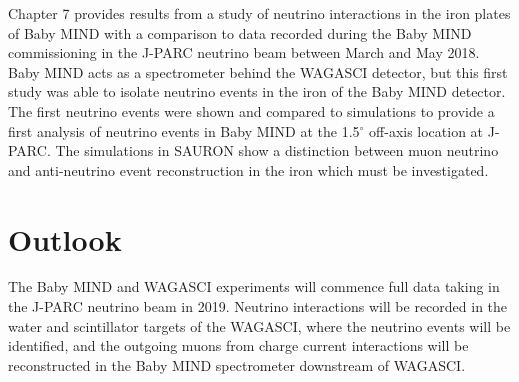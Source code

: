Chapter 7 provides results from a study of neutrino interactions in the iron plates of Baby MIND with a comparison to data recorded during the Baby MIND commissioning in the J-PARC neutrino beam between March and May 2018. Baby MIND acts as a spectrometer behind the WAGASCI detector, but this first study was able to isolate neutrino events in the iron of the Baby MIND detector. The first neutrino events were shown and compared to simulations to provide a first analysis of neutrino events in Baby MIND at the 1.5$^\circ$ off-axis location at J-PARC. The simulations in SAURON show a distinction between muon neutrino and anti-neutrino event reconstruction in the iron which must be investigated.



\section{Outlook}


The Baby MIND and WAGASCI experiments will commence full data taking in the J-PARC neutrino beam in 2019. Neutrino interactions will be recorded in the water and scintillator targets of the WAGASCI, where the neutrino events will be identified, and the outgoing muons from charge current interactions will be reconstructed in the Baby MIND spectrometer downstream of WAGASCI.



